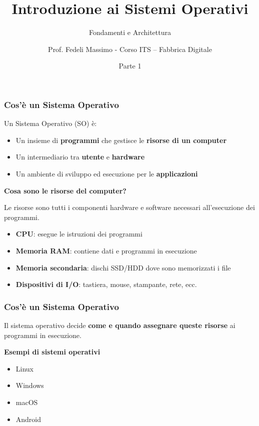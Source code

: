 \documentclass{beamer}
\title{Introduzione ai Sistemi Operativi}
\subtitle{Fondamenti e Architettura}
\author{Prof. Fedeli Massimo - Corso ITS – Fabbrica Digitale}
\date{Parte 1}
\begin{document}
	
	\frame{\titlepage}
	
	
	\begin{frame}
		\frametitle{Cos'è un Sistema Operativo}
		
		Un Sistema Operativo (SO) è:
		
		\begin{itemize}
			\item Un insieme di \textbf{programmi} che gestisce le \textbf{risorse di un computer}
			\item Un intermediario tra \textbf{utente} e \textbf{hardware}
			\item Un ambiente di sviluppo ed esecuzione per le \textbf{applicazioni}
		\end{itemize}
		\vspace*{0.5 cm}
		\textbf{Cosa sono le risorse del computer?}
		
		Le risorse sono tutti i componenti hardware e software necessari
		all'esecuzione dei programmi.
		
		\begin{itemize}
			\item \textbf{CPU}: esegue le istruzioni dei programmi
			\item \textbf{Memoria RAM}: contiene dati e programmi in esecuzione
			\item \textbf{Memoria secondaria}: dischi SSD/HDD dove sono memorizzati i file
			\item \textbf{Dispositivi di I/O}: tastiera, mouse, stampante, rete, ecc.
		\end{itemize}
	
		
	\end{frame}
	
	
	\begin{frame}
				\frametitle{Cos'è un Sistema Operativo}
		Il sistema operativo decide \textbf{come e quando assegnare queste risorse}
ai programmi in esecuzione.

\textbf{Esempi di sistemi operativi}

\begin{itemize}
	\item Linux
	\item Windows
	\item macOS
	\item Android
\end{itemize}
	\end{frame}
	
\end{document}
